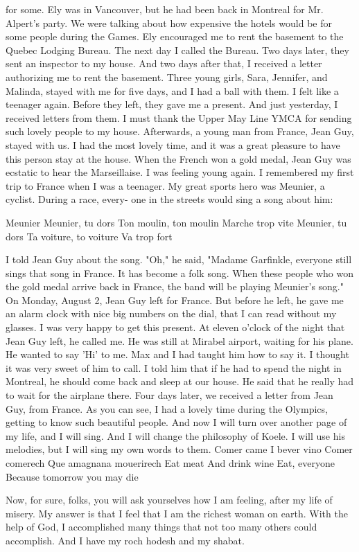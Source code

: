 for some.
Ely was in Vancouver, but he had been back in Montreal 
for Mr.
Alpert's party.
We were talking about how expensive the 
hotels would be for some people during the Games.
Ely encouraged 
me to rent the basement to the Quebec Lodging Bureau.
The next day I called the Bureau.
Two days later, they sent 
an inspector to my house.
And two days after that, I received a 
letter authorizing me to rent the basement.
Three young girls, Sara, Jennifer, and Malinda, stayed with me 
for five days, and I had a ball with them.
I felt like a teenager 
again.
Before they left, they gave me a present.
And just yesterday, I received letters from them.
I must thank the Upper May Line 
YMCA for sending such lovely people to my house.
Afterwards, a young man from France, Jean Guy, stayed with us.
I had the most lovely time, and it was a great pleasure to have this 
person stay at the house.
When the French won a gold medal, Jean 
Guy was ecstatic to hear the Marseillaise.
I was feeling young again.
I remembered my first trip to France when I was a teenager.
My great sports hero was Meunier, a cyclist.
During a race, every-
one in the streets would sing a song about him: 

Meunier 
Meunier, tu dors 
Ton moulin, ton moulin 
Marche trop vite 
Meunier, tu dors 
Ta voiture, to voiture 
Va trop fort 

I told Jean Guy about the song.
"Oh," he said, "Madame Garfinkle, everyone still sings that 
song in France.
It has become a folk song.
When these people who 
won the gold medal arrive back in France, the band will be playing 
Meunier's song."
On Monday, August 2, Jean Guy left for France.
But before he left, he gave me an alarm clock with nice big numbers on the dial, that I can read without my glasses.
I was very 
happy to get this present.
At eleven o'clock of the night that Jean Guy left, he called 
me.
He was still at Mirabel airport, waiting for his plane.
He 
wanted to say 'Hi' to me.
Max and I had taught him how to say it.
I thought it was very sweet of him to call.
I told him that if he 
had to spend the night in Montreal, he should come back and sleep 
at our house.
He said that he really had to wait for the airplane
there.
Four days later, we received a letter from Jean Guy, from 
France.
As you can see, I had a lovely time during the Olympics, 
getting to know such beautiful people.
And now I will turn over another page of my life, and I will 
sing.
And I will change the philosophy of Koele.
I will use his 
melodies, but I will sing my own words to them.
Comer came 
I bever vino 
Comer comerech 
Que amagnana mouerirech 
Eat meat 
And drink wine 
Eat, everyone 
Because tomorrow you may die 

Now, for sure, folks, you will ask yourselves how I am feeling, 
after my life of misery.
My answer is that I feel that I am the richest woman on earth.
With the help of God, I accomplished many 
things that not too many others could accomplish.
And I have my 
roch hodesh and my shabat.